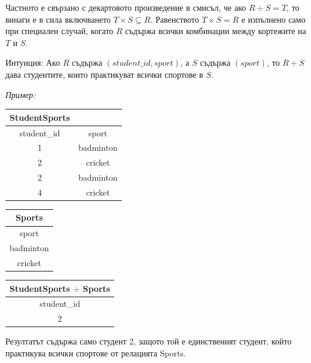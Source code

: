 \documentclass{scrartcl}
\begin{document}
\begin{FlushLeft}
Частното е свързано с декартовото произведение в смисъл, че ако $R \div S = T$, то винаги е в сила включването $T \times S \subseteq R$. Равенството $T \times S = R$ е изпълнено само при специален случай, когато $R$ съдържа всички комбинации между кортежите на $T$ и $S$.

Интуиция: Ако $R$ съдържа $(student\_id, sport)$, а $S$ съдържа $(sport)$, то $R \div S$ дава студентите, които практикуват всички спортове в $S$.

\textit{Пример:}

\begin{center}
\begin{tabular}{|c|c|}
\hline
\textbf{StudentSports} & \\
\hline
student\_id & sport \\
\hline
1 & badminton \\
2 & cricket \\
2 & badminton \\
4 & cricket \\
\hline
\end{tabular}
\hspace{1cm}
\begin{tabular}{|c|}
\hline
\textbf{Sports} \\
\hline
sport \\
\hline
badminton \\
cricket \\
\hline
\end{tabular}
\hspace{1cm}
\begin{tabular}{|c|}
\hline
\textbf{StudentSports} $\div$ \textbf{Sports} \\
\hline
student\_id \\
\hline
2 \\
\hline
\end{tabular}
\end{center}

Резултатът съдържа само студент 2, защото той е единственият студент, който практикува всички спортове от релацията Sports.

\end{FlushLeft}
\end{document}
